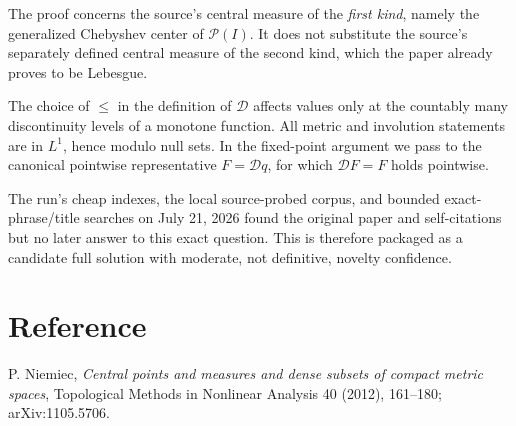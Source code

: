 \documentclass[11pt]{article}
\newcommand{\Prob}{\mathcal P}
\newcommand{\D}{\mathcal D}
\begin{document}
The proof concerns the source's central measure of the \emph{first kind},
namely the generalized Chebyshev center of $\Prob(I)$.  It does not substitute
the source's separately defined central measure of the second kind, which the
paper already proves to be Lebesgue.

The choice of $\leq$ in the definition of $\D$ affects values only at the
countably many discontinuity levels of a monotone function.  All metric and
involution statements are in $L^1$, hence modulo null sets.  In the fixed-point
argument we pass to the canonical pointwise representative $F=\D q$, for which
$\D F=F$ holds pointwise.

The run's cheap indexes, the local source-probed corpus, and bounded
exact-phrase/title searches on July 21, 2026 found the original paper and
self-citations but no later answer to this exact question.  This is therefore
packaged as a candidate full solution with moderate, not definitive, novelty
confidence.

\section*{Reference}

P. Niemiec, \emph{Central points and measures and dense subsets of compact
metric spaces}, Topological Methods in Nonlinear Analysis 40 (2012),
161--180; arXiv:1105.5706.
\end{document}

